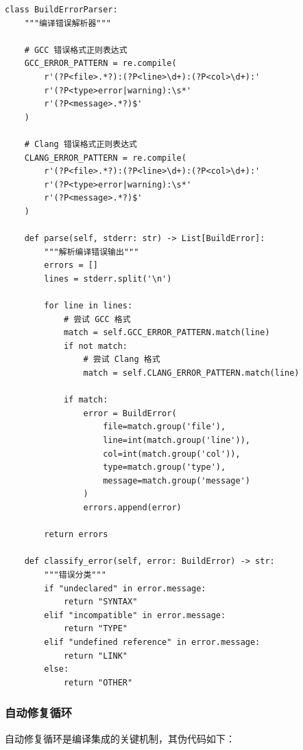 \begin{lstlisting}[style=Python,abovecaptionskip=0pt,belowcaptionskip=0pt]
class BuildErrorParser:
    """编译错误解析器"""
    
    # GCC 错误格式正则表达式
    GCC_ERROR_PATTERN = re.compile(
        r'(?P<file>.*?):(?P<line>\d+):(?P<col>\d+):'
        r'(?P<type>error|warning):\s*'
        r'(?P<message>.*?)$'
    )
    
    # Clang 错误格式正则表达式
    CLANG_ERROR_PATTERN = re.compile(
        r'(?P<file>.*?):(?P<line>\d+):(?P<col>\d+):'
        r'(?P<type>error|warning):\s*'
        r'(?P<message>.*?)$'
    )
    
    def parse(self, stderr: str) -> List[BuildError]:
        """解析编译错误输出"""
        errors = []
        lines = stderr.split('\n')
        
        for line in lines:
            # 尝试 GCC 格式
            match = self.GCC_ERROR_PATTERN.match(line)
            if not match:
                # 尝试 Clang 格式
                match = self.CLANG_ERROR_PATTERN.match(line)
            
            if match:
                error = BuildError(
                    file=match.group('file'),
                    line=int(match.group('line')),
                    col=int(match.group('col')),
                    type=match.group('type'),
                    message=match.group('message')
                )
                errors.append(error)
        
        return errors
    
    def classify_error(self, error: BuildError) -> str:
        """错误分类"""
        if "undeclared" in error.message:
            return "SYNTAX"
        elif "incompatible" in error.message:
            return "TYPE"
        elif "undefined reference" in error.message:
            return "LINK"
        else:
            return "OTHER"
\end{lstlisting}

\subsubsection{自动修复循环}

自动修复循环是编译集成的关键机制，其伪代码如下：

